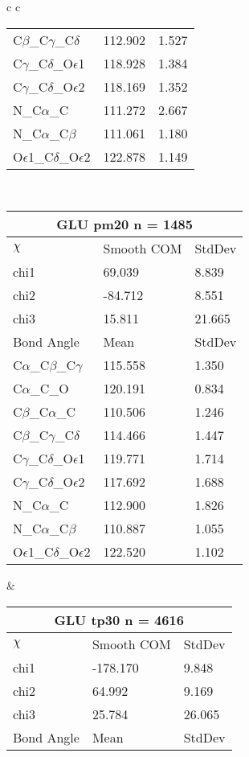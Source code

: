 \begin{longtable}{ c c }
\begin{tabular}{ l l l }
  C$\beta$\_C$\gamma$\_C$\delta$ & 112.902 & 1.527\\
  C$\gamma$\_C$\delta$\_O$\epsilon$1 & 118.928 & 1.384\\
  C$\gamma$\_C$\delta$\_O$\epsilon$2 & 118.169 & 1.352\\
  N\_C$\alpha$\_C & 111.272 & 2.667\\
  N\_C$\alpha$\_C$\beta$ & 111.061 & 1.180\\
  O$\epsilon$1\_C$\delta$\_O$\epsilon$2 & 122.878 & 1.149\\
  \bottomrule
  \end{tabular}
  \\
  \begin{tabular}{ l l l }
  \toprule
  \multicolumn{3}{c}{GLU \textbf{pm20} n = 1485} \\ \toprule
  $\chi$       & Smooth COM & StdDev \\ \midrule
  chi1 & 69.039 & 8.839 \\ 
  chi2 & -84.712 & 8.551 \\ 
  chi3 & 15.811 & 21.665 \\ \midrule
  Bond Angle   & Mean     & StdDev \\ \midrule
  C$\alpha$\_C$\beta$\_C$\gamma$ & 115.558 & 1.350\\
  C$\alpha$\_C\_O & 120.191 & 0.834\\
  C$\beta$\_C$\alpha$\_C & 110.506 & 1.246\\
  C$\beta$\_C$\gamma$\_C$\delta$ & 114.466 & 1.447\\
  C$\gamma$\_C$\delta$\_O$\epsilon$1 & 119.771 & 1.714\\
  C$\gamma$\_C$\delta$\_O$\epsilon$2 & 117.692 & 1.688\\
  N\_C$\alpha$\_C & 112.900 & 1.826\\
  N\_C$\alpha$\_C$\beta$ & 110.887 & 1.055\\
  O$\epsilon$1\_C$\delta$\_O$\epsilon$2 & 122.520 & 1.102\\
  \bottomrule
  \end{tabular}
  &
  \begin{tabular}{ l l l }
  \toprule
  \multicolumn{3}{c}{GLU \textbf{tp30} n = 4616} \\ \toprule
  $\chi$       & Smooth COM & StdDev \\ \midrule
  chi1 & -178.170 & 9.848 \\ 
  chi2 & 64.992 & 9.169 \\ 
  chi3 & 25.784 & 26.065 \\ \midrule
  Bond Angle   & Mean     & StdDev \\ \midrule

\end{tabular}
\end{longtable}
